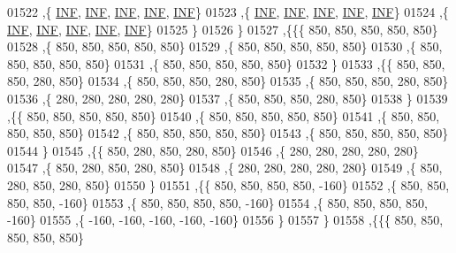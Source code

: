 \begin{DoxyCode}
01522    ,\{   \mbox{\hyperlink{1_88_84__epars_8h_a12c2040f25d8e3a7b9e1c2024c618cb6}{INF}},   \mbox{\hyperlink{1_88_84__epars_8h_a12c2040f25d8e3a7b9e1c2024c618cb6}{INF}},   \mbox{\hyperlink{1_88_84__epars_8h_a12c2040f25d8e3a7b9e1c2024c618cb6}{INF}},   \mbox{\hyperlink{1_88_84__epars_8h_a12c2040f25d8e3a7b9e1c2024c618cb6}{INF}},   \mbox{\hyperlink{1_88_84__epars_8h_a12c2040f25d8e3a7b9e1c2024c618cb6}{INF}}\}
01523    ,\{   \mbox{\hyperlink{1_88_84__epars_8h_a12c2040f25d8e3a7b9e1c2024c618cb6}{INF}},   \mbox{\hyperlink{1_88_84__epars_8h_a12c2040f25d8e3a7b9e1c2024c618cb6}{INF}},   \mbox{\hyperlink{1_88_84__epars_8h_a12c2040f25d8e3a7b9e1c2024c618cb6}{INF}},   \mbox{\hyperlink{1_88_84__epars_8h_a12c2040f25d8e3a7b9e1c2024c618cb6}{INF}},   \mbox{\hyperlink{1_88_84__epars_8h_a12c2040f25d8e3a7b9e1c2024c618cb6}{INF}}\}
01524    ,\{   \mbox{\hyperlink{1_88_84__epars_8h_a12c2040f25d8e3a7b9e1c2024c618cb6}{INF}},   \mbox{\hyperlink{1_88_84__epars_8h_a12c2040f25d8e3a7b9e1c2024c618cb6}{INF}},   \mbox{\hyperlink{1_88_84__epars_8h_a12c2040f25d8e3a7b9e1c2024c618cb6}{INF}},   \mbox{\hyperlink{1_88_84__epars_8h_a12c2040f25d8e3a7b9e1c2024c618cb6}{INF}},   \mbox{\hyperlink{1_88_84__epars_8h_a12c2040f25d8e3a7b9e1c2024c618cb6}{INF}}\}
01525    \}
01526   \}
01527  ,\{\{\{   850,   850,   850,   850,   850\}
01528    ,\{   850,   850,   850,   850,   850\}
01529    ,\{   850,   850,   850,   850,   850\}
01530    ,\{   850,   850,   850,   850,   850\}
01531    ,\{   850,   850,   850,   850,   850\}
01532    \}
01533   ,\{\{   850,   850,   850,   280,   850\}
01534    ,\{   850,   850,   850,   280,   850\}
01535    ,\{   850,   850,   850,   280,   850\}
01536    ,\{   280,   280,   280,   280,   280\}
01537    ,\{   850,   850,   850,   280,   850\}
01538    \}
01539   ,\{\{   850,   850,   850,   850,   850\}
01540    ,\{   850,   850,   850,   850,   850\}
01541    ,\{   850,   850,   850,   850,   850\}
01542    ,\{   850,   850,   850,   850,   850\}
01543    ,\{   850,   850,   850,   850,   850\}
01544    \}
01545   ,\{\{   850,   280,   850,   280,   850\}
01546    ,\{   280,   280,   280,   280,   280\}
01547    ,\{   850,   280,   850,   280,   850\}
01548    ,\{   280,   280,   280,   280,   280\}
01549    ,\{   850,   280,   850,   280,   850\}
01550    \}
01551   ,\{\{   850,   850,   850,   850,  -160\}
01552    ,\{   850,   850,   850,   850,  -160\}
01553    ,\{   850,   850,   850,   850,  -160\}
01554    ,\{   850,   850,   850,   850,  -160\}
01555    ,\{  -160,  -160,  -160,  -160,  -160\}
01556    \}
01557   \}
01558  ,\{\{\{   850,   850,   850,   850,   850\}

\end{DoxyCode}

